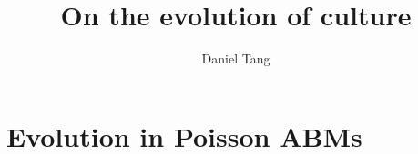 \documentclass[a4paper]{article}
\title{On the evolution of culture}
\author{Daniel Tang}
\begin{document}
\maketitle

\section{Evolution in Poisson ABMs}
\end{document}
